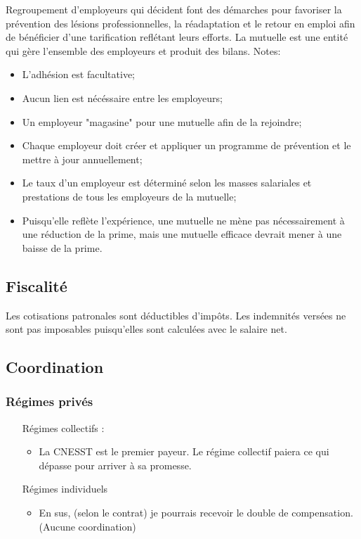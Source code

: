 \documentclass[10pt, french]{article}
\begin{document}
\begin{multicols*}{3}
\begin{definitionNOHFILL}
Regroupement d’employeurs qui décident font des démarches pour favoriser la prévention des lésions professionnelles, la réadaptation et le retour en emploi afin de bénéficier d’une tarification reflétant leurs efforts. La mutuelle est une entité qui gère l'ensemble des employeurs et produit des bilans.
\tcbline
Notes:
\begin{itemize}[leftmargin = *]
	\item	L'adhésion est facultative; 
	\item	Aucun lien est nécéssaire entre les employeurs;
	\item	Un employeur "magasine" pour une mutuelle afin de la rejoindre;
	\item	Chaque employeur doit créer et appliquer un programme de prévention et le mettre à jour annuellement;
	\item	Le taux d'un employeur est déterminé selon les masses salariales et prestations de tous les employeurs de la mutuelle;
	\item	Puisqu'elle reflète l'expérience, une mutuelle ne mène pas nécessairement à une réduction de la prime, mais une mutuelle efficace devrait mener à une baisse de la prime.
\end{itemize}
\end{definitionNOHFILL}

\subsection*{Fiscalité}
Les cotisations patronales sont déductibles d'impôts.
Les indemnités versées ne sont pas imposables puisqu'elles sont calculées avec le salaire net.

\subsection*{Coordination}
\subsubsection*{Régimes privés}
\begin{itemize}
\item[Régimes collectifs :]
	\begin{itemize}
	\item La CNESST est le premier payeur. Le régime collectif paiera ce qui dépasse pour arriver à sa promesse.
	\end{itemize}
\item[Régimes individuels]
	\begin{itemize}
	\item En sus, (selon le contrat) je pourrais recevoir le double de compensation. (Aucune coordination)
	\end{itemize}
\end{itemize}

\end{multicols*}
\end{document}
